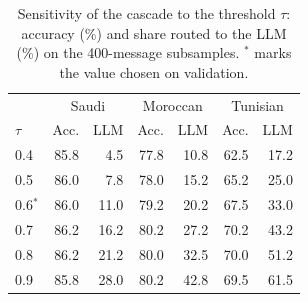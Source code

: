 \begin{table}[t]\centering\small\caption{Sensitivity of the cascade to the threshold $\tau$: accuracy (\%) and share routed to the LLM (\%) on the 400-message subsamples. $^*$ marks the value chosen on validation.}\label{tab:tau}
\begin{tabular}{lrrrrrr}\toprule
& \multicolumn{2}{c}{Saudi} & \multicolumn{2}{c}{Moroccan} & \multicolumn{2}{c}{Tunisian}\\
$\tau$ & Acc. & LLM & Acc. & LLM & Acc. & LLM \\\midrule
0.4 & 85.8 & 4.5 & 77.8 & 10.8 & 62.5 & 17.2 \\
0.5 & 86.0 & 7.8 & 78.0 & 15.2 & 65.2 & 25.0 \\
0.6$^*$ & 86.0 & 11.0 & 79.2 & 20.2 & 67.5 & 33.0 \\
0.7 & 86.2 & 16.2 & 80.2 & 27.2 & 70.2 & 43.2 \\
0.8 & 86.2 & 21.2 & 80.0 & 32.5 & 70.0 & 51.2 \\
0.9 & 85.8 & 28.0 & 80.2 & 42.8 & 69.5 & 61.5 \\
\bottomrule\end{tabular}\end{table}
